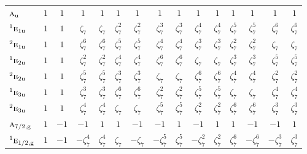 \documentclass[10pt,a4paper]{article}
\makeatletter
\def\grouprule#1#2{\noalign{\marks\LTgroupmarks{\the\belowrulesep}\nobreak\vskip#1%
  \vskip\aboverulesep}\multispan\LT@cols\unskip{\leaders\hrule\@height#2\hfill\kern\z@}\cr
  \noalign{\penalty\LTrulebreak\vskip\belowrulesep\global\@lastruleclass\z@}}
\numberwithin{equation}{section}
\newcommand{\irr}[1]{\text{\normalfont\scshape #1}}
\newcommand{\conjpair}[1]{{}^{#1}}
\newcommand{\ptag}[1]{\mathrm{#1}}
\newcommand{\rootunity}[1]{\zeta_{#1}}
\makeatother
\begin{document}
{\begin{longtable}{@{}lcccccccccccccc@{}}
$\irr{a}_{\ptag{u}}$ & $1$ & $1$ & $1$ & $1$ & $1$ & $1$ & $1$ & $1$ & $1$ & $1$ & $1$ & $1$ & $1$ & $1$\\
$\conjpair{1}\irr{e}_{1\ptag{u}}$ & $1$ & $1$ & $\rootunity{7}$ & $\rootunity{7}$ & $\rootunity{7}^{2}$ & $\rootunity{7}^{2}$ & $\rootunity{7}^{3}$ & $\rootunity{7}^{3}$ & $\rootunity{7}^{4}$ & $\rootunity{7}^{4}$ & $\rootunity{7}^{5}$ & $\rootunity{7}^{5}$ & $\rootunity{7}^{6}$ & $\rootunity{7}^{6}$\\
$\conjpair{2}\irr{e}_{1\ptag{u}}$ & $1$ & $1$ & $\rootunity{7}^{6}$ & $\rootunity{7}^{6}$ & $\rootunity{7}^{5}$ & $\rootunity{7}^{5}$ & $\rootunity{7}^{4}$ & $\rootunity{7}^{4}$ & $\rootunity{7}^{3}$ & $\rootunity{7}^{3}$ & $\rootunity{7}^{2}$ & $\rootunity{7}^{2}$ & $\rootunity{7}$ & $\rootunity{7}$\\
$\conjpair{1}\irr{e}_{2\ptag{u}}$ & $1$ & $1$ & $\rootunity{7}^{2}$ & $\rootunity{7}^{2}$ & $\rootunity{7}^{4}$ & $\rootunity{7}^{4}$ & $\rootunity{7}^{6}$ & $\rootunity{7}^{6}$ & $\rootunity{7}$ & $\rootunity{7}$ & $\rootunity{7}^{3}$ & $\rootunity{7}^{3}$ & $\rootunity{7}^{5}$ & $\rootunity{7}^{5}$\\
$\conjpair{2}\irr{e}_{2\ptag{u}}$ & $1$ & $1$ & $\rootunity{7}^{5}$ & $\rootunity{7}^{5}$ & $\rootunity{7}^{3}$ & $\rootunity{7}^{3}$ & $\rootunity{7}$ & $\rootunity{7}$ & $\rootunity{7}^{6}$ & $\rootunity{7}^{6}$ & $\rootunity{7}^{4}$ & $\rootunity{7}^{4}$ & $\rootunity{7}^{2}$ & $\rootunity{7}^{2}$\\
$\conjpair{1}\irr{e}_{3\ptag{u}}$ & $1$ & $1$ & $\rootunity{7}^{3}$ & $\rootunity{7}^{3}$ & $\rootunity{7}^{6}$ & $\rootunity{7}^{6}$ & $\rootunity{7}^{2}$ & $\rootunity{7}^{2}$ & $\rootunity{7}^{5}$ & $\rootunity{7}^{5}$ & $\rootunity{7}$ & $\rootunity{7}$ & $\rootunity{7}^{4}$ & $\rootunity{7}^{4}$\\
$\conjpair{2}\irr{e}_{3\ptag{u}}$ & $1$ & $1$ & $\rootunity{7}^{4}$ & $\rootunity{7}^{4}$ & $\rootunity{7}$ & $\rootunity{7}$ & $\rootunity{7}^{5}$ & $\rootunity{7}^{5}$ & $\rootunity{7}^{2}$ & $\rootunity{7}^{2}$ & $\rootunity{7}^{6}$ & $\rootunity{7}^{6}$ & $\rootunity{7}^{3}$ & $\rootunity{7}^{3}$\\
\grouprule{0pt}{\lightrulewidth}
$\irr{a}_{7/2,\ptag{g}}$ & $1$ & $-1$ & $-1$ & $1$ & $1$ & $-1$ & $-1$ & $1$ & $-1$ & $1$ & $1$ & $-1$ & $-1$ & $1$\\
$\conjpair{1}\irr{e}_{1/2,\ptag{g}}$ & $1$ & $-1$ & $-\rootunity{7}^{4}$ & $\rootunity{7}^{4}$ & $\rootunity{7}$ & $-\rootunity{7}$ & $-\rootunity{7}^{5}$ & $\rootunity{7}^{5}$ & $-\rootunity{7}^{2}$ & $\rootunity{7}^{2}$ & $\rootunity{7}^{6}$ & $-\rootunity{7}^{6}$ & $-\rootunity{7}^{3}$ & $\rootunity{7}^{3}$\\

\end{longtable}}
\end{document}
